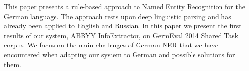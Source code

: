 This paper presents a rule-based approach to Named Entity Recognition for the German language. The approach rests upon deep linguistic parsing and has already been applied to English and Russian. In this paper we present the first results of our system, ABBYY InfoExtractor, on GermEval 2014 Shared Task corpus. We focus on the main challenges of German NER that we have encountered when adapting our system to German and possible solutions for them.
